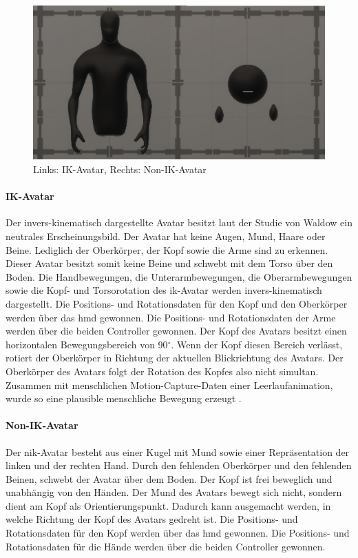 \documentclass[a4paper,11pt]{article}%
\renewcommand{\\}{\vspace*{0.5\baselineskip} \newline}
\begin{document}
	\begin{figure}[H]
		\begin{footnotesize}
		\centering
			\includegraphics[width=\textwidth]{Abbildungen/Avatars.JPG}	
			\caption[Die verwendeten Avatare]{Links: IK-Avatar, Rechts: Non-IK-Avatar}
			\label{AvatareAussehen}
		\end{footnotesize}
	\end{figure}
		\paragraph{IK-Avatar}
Der invers-kinematisch dargestellte Avatar besitzt laut der Studie von Waldow \citep[p.251]{waldow2019investigating} ein neutrales Erscheinungsbild. Der Avatar hat keine Augen, Mund, Haare oder Beine. Lediglich der Oberkörper, der Kopf sowie die Arme sind zu erkennen. Dieser Avatar besitzt somit keine Beine und schwebt mit dem Torso über den Boden.
Die Handbewegungen, die Unterarmbewegungen, die Oberarmbewegungen sowie die Kopf- und Torsorotation des \ac{ik}-Avatar werden invers-kinematisch dargestellt. Die Positions- und Rotationsdaten für den Kopf und den Oberkörper werden über das \ac{hmd} gewonnen. Die Positions- und Rotationsdaten der Arme werden über die beiden Controller gewonnen. Der Kopf des Avatars besitzt einen horizontalen Bewegungsbereich von 90$^\circ$. Wenn der Kopf diesen Bereich verlässt, rotiert der Oberkörper in Richtung der aktuellen Blickrichtung des Avatars. Der Oberkörper des Avatars folgt der Rotation des Kopfes also nicht simultan. Zusammen mit menschlichen Motion-Capture-Daten einer Leerlaufanimation, wurde so eine plausible menschliche Bewegung erzeugt \citep[p.251]{waldow2019investigating}.

		\paragraph{Non-IK-Avatar}
Der \ac{nik}-Avatar besteht aus einer Kugel mit Mund sowie einer Repräsentation der linken und der rechten Hand. Durch den fehlenden Oberkörper und den fehlenden Beinen, schwebt der Avatar über dem Boden. Der Kopf ist frei beweglich und unabhängig von den Händen. Der Mund des Avatars bewegt sich nicht, sondern dient am Kopf als Orientierungspunkt. Dadurch kann ausgemacht werden, in welche Richtung der Kopf des Avatars gedreht ist. Die Positions- und Rotationsdaten für den Kopf werden über das \ac{hmd} gewonnen. Die Positions- und Rotationsdaten für die Hände werden über die beiden Controller gewonnen.
\newpage
\end{document}
